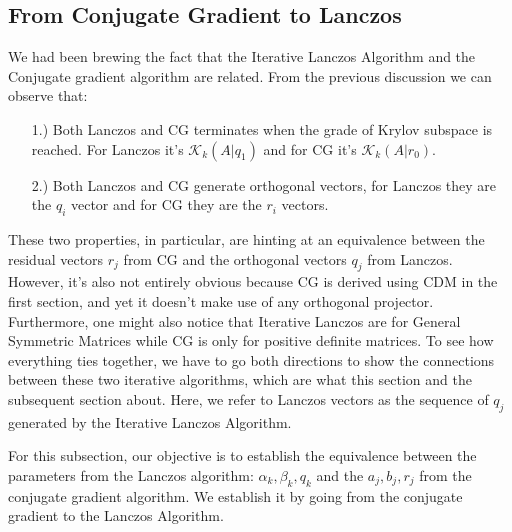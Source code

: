 \documentclass[]{article}
\theoremstyle{definition}
\begin{document}
    \subsection{From Conjugate Gradient to Lanczos}
        We had been brewing the fact that the Iterative Lanczos Algorithm and the Conjugate gradient algorithm are related. From the previous discussion we can observe that: 
        \begin{enumerate}
            \item [1.)] Both Lanczos and CG terminates when the grade of Krylov subspace is reached. For Lanczos it's $\mathcal K_k(A|q_1)$ and for CG it's $\mathcal K_k(A|r_0)$.
            \item [2.)] Both Lanczos and CG generate orthogonal vectors, for Lanczos they are the $q_i$ vector and for CG they are the $r_i$ vectors. 
        \end{enumerate}
        These two properties, in particular, are hinting at an equivalence between the residual vectors $r_j$ from CG and the orthogonal vectors $q_j$ from Lanczos. However, it's also not entirely obvious because CG is derived using CDM in the first section, and yet it doesn't make use of any orthogonal projector. Furthermore, one might also notice that Iterative Lanczos are for General Symmetric Matrices while CG is only for positive definite matrices. To see how everything ties together, we have to go both directions to show the connections between these two iterative algorithms, which are what this section and the subsequent section about. Here, we refer to Lanczos vectors as the sequence of $q_j$ generated by the Iterative Lanczos Algorithm. 
        \par
        For this subsection, our objective is to establish the equivalence between the parameters from the Lanczos algorithm: $\alpha_k, \beta_k, q_k$ and the $a_j, b_j, r_j$ from the conjugate gradient algorithm. We establish it by going from the conjugate gradient to the Lanczos Algorithm. 
\end{document}

